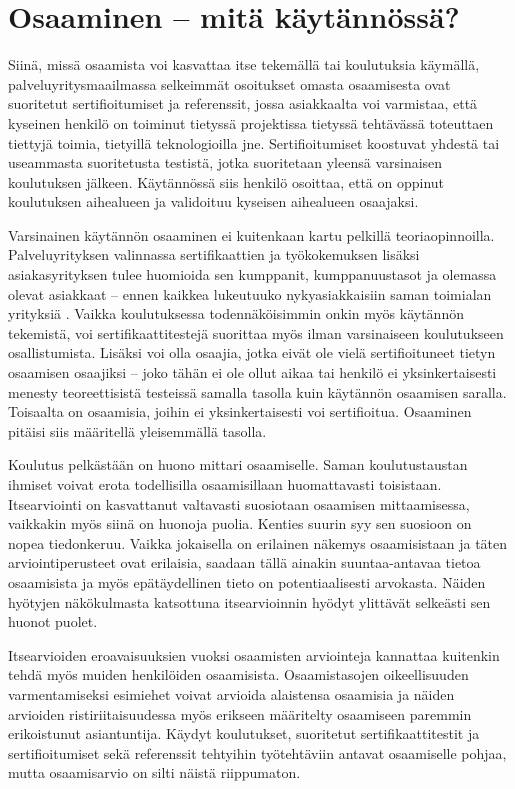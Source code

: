 \documentclass[a4paper,finnish,12pt]{article}
\begin{document}
\clearpage

\section{Osaaminen -- mitä käytännössä?}

Siinä, missä osaamista voi kasvattaa itse tekemällä tai koulutuksia käymällä, palveluyritysmaailmassa selkeimmät osoitukset omasta osaamisesta ovat suoritetut sertifioitumiset ja referenssit, jossa asiakkaalta voi varmistaa, että kyseinen henkilö on toiminut tietyssä projektissa tietyssä tehtävässä toteuttaen tiettyjä toimia, tietyillä teknologioilla jne. Sertifioitumiset koostuvat yhdestä tai useammasta suoritetusta testistä, jotka suoritetaan yleensä varsinaisen koulutuksen jälkeen. Käytännössä siis henkilö osoittaa, että on oppinut koulutuksen aihealueen ja validoituu kyseisen aihealueen osaajaksi.

Varsinainen käytännön osaaminen ei kuitenkaan kartu pelkillä teoriaopinnoilla. Palveluyrityksen valinnassa sertifikaattien ja työkokemuksen lisäksi asiakasyrityksen tulee huomioida sen kumppanit, kumppanuustasot ja olemassa olevat asiakkaat  -- ennen kaikkea lukeutuuko nykyasiakkaisiin saman toimialan yrityksiä \cite{ICT-haasteet}. Vaikka koulutuksessa todennäköisimmin onkin myös käytännön tekemistä, voi sertifikaattitestejä suorittaa myös ilman varsinaiseen koulutukseen osallistumista. Lisäksi voi olla osaajia, jotka eivät ole vielä sertifioituneet tietyn osaamisen osaajiksi -- joko tähän ei ole ollut aikaa tai henkilö ei yksinkertaisesti menesty teoreettisistä testeissä samalla tasolla kuin käytännön osaamisen saralla. Toisaalta on osaamisia, joihin ei yksinkertaisesti voi sertifioitua. Osaaminen pitäisi siis määritellä yleisemmällä tasolla.

Koulutus pelkästään on huono mittari osaamiselle. Saman koulutustaustan ihmiset voivat erota todellisilla osaamisillaan huomattavasti toisistaan. Itsearviointi on kasvattanut valtavasti suosiotaan osaamisen mittaamisessa, vaikkakin myös siinä on huonoja puolia. Kenties suurin syy sen suosioon on nopea tiedonkeruu. Vaikka jokaisella on erilainen näkemys osaamisistaan ja täten arviointiperusteet ovat erilaisia, saadaan tällä ainakin suuntaa-antavaa tietoa osaamisista ja myös epätäydellinen tieto on potentiaalisesti arvokasta. Näiden hyötyjen näkökulmasta katsottuna itsearvioinnin hyödyt ylittävät selkeästi sen huonot puolet. \cite{self-assessment_in_skill_measurement}

Itsearvioiden eroavaisuuksien vuoksi osaamisten arviointeja kannattaa kuitenkin tehdä myös muiden henkilöiden osaamisista. Osaamistasojen oikeellisuuden varmentamiseksi esimiehet voivat arvioida alaistensa osaamisia ja näiden arvioiden ristiriitaisuudessa myös erikseen määritelty osaamiseen paremmin erikoistunut asiantuntija. Käydyt koulutukset, suoritetut sertifikaattitestit ja sertifioitumiset sekä referenssit tehtyihin työtehtäviin antavat osaamiselle pohjaa, mutta osaamisarvio on silti näistä riippumaton.
\end{document}
